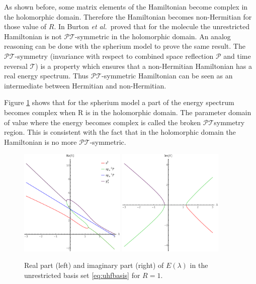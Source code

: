 \documentclass[11pt,a4paper]{article}
\newcommand{\pt}{$\mathcal{PT}$}
\begin{document}
As shown before, some matrix elements of the Hamiltonian become complex in the holomorphic domain. Therefore the Hamiltonian becomes non-Hermitian for those value of $R$. In \cite{Burton_2019a} Burton \textit{et al.}~proved that for the  molecule the unrestricted Hamiltonian is not \pt -symmetric in the holomorphic domain. An analog reasoning can be done with the spherium model to prove the same result. The \pt -symmetry (invariance with respect to combined space reflection $\mathcal{P}$ and time reversal $\mathcal{T}$) is a property which ensures that a non-Hermitian Hamiltonian has a real energy spectrum. Thus \pt -symmetric Hamiltonian can be seen as an intermediate between Hermitian and non-Hermitian.

Figure \ref{fig:UHFPT} shows that for the spherium model a part of the energy spectrum becomes complex when R is in the holomorphic domain. The parameter domain of value where the energy becomes complex is called the broken \pt symmetry  region. This is consistent with the fact that in the holomorphic domain the Hamiltonian is no more \pt -symmetric. 

\begin{figure}
    \centering
    \includegraphics[width=0.45\textwidth]{ReNRJPT.pdf}
    \includegraphics[width=0.45\textwidth]{ImNRJPT.pdf}
    \caption{\centering Real part (left) and imaginary part (right) of $E(\lambda)$ in the unrestricted basis set \eqref{eq:uhfbasis} for $R=1$.}
    \label{fig:UHFPT}
\end{figure}
\end{document}
